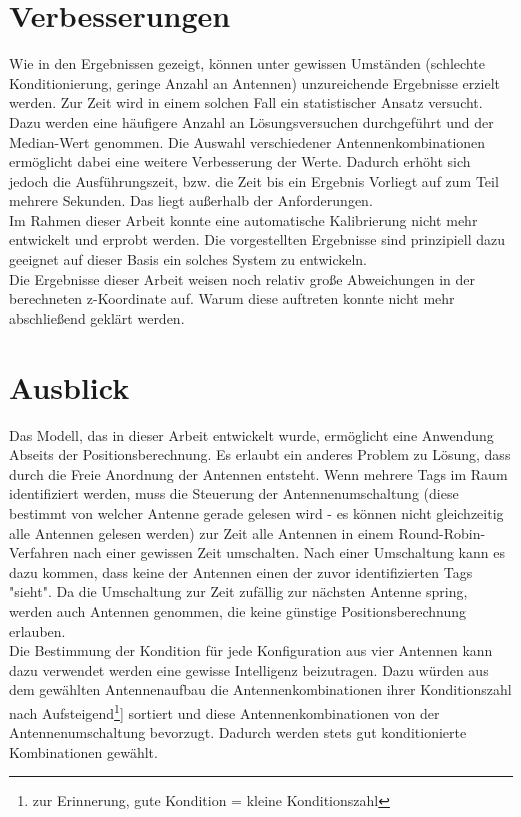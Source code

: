 %
\section{Verbesserungen}
%
Wie in den Ergebnissen gezeigt, können unter gewissen Umständen (schlechte Konditionierung, geringe Anzahl an Antennen) unzureichende Ergebnisse erzielt werden. Zur Zeit wird in einem solchen Fall ein statistischer Ansatz versucht. Dazu werden eine häufigere Anzahl an Lösungsversuchen durchgeführt und der Median-Wert genommen. Die Auswahl verschiedener Antennenkombinationen ermöglicht dabei eine weitere Verbesserung der Werte. Dadurch erhöht sich jedoch die Ausführungszeit, bzw. die Zeit bis ein Ergebnis Vorliegt auf zum Teil mehrere Sekunden. Das liegt außerhalb der Anforderungen. \\
%
Im Rahmen dieser Arbeit konnte eine automatische Kalibrierung nicht mehr entwickelt und erprobt werden. Die vorgestellten Ergebnisse sind prinzipiell dazu geeignet auf dieser Basis ein solches System zu entwickeln.\\

Die Ergebnisse dieser Arbeit weisen noch relativ große Abweichungen in der berechneten z-Koordinate auf. Warum diese auftreten konnte nicht mehr abschließend geklärt werden.
%
\section{Ausblick}
%
Das Modell, das in dieser Arbeit entwickelt wurde, ermöglicht eine Anwendung Abseits der Positionsberechnung. Es erlaubt ein anderes Problem zu Lösung, dass durch die Freie Anordnung der Antennen entsteht. Wenn mehrere Tags im Raum identifiziert werden, muss die Steuerung der Antennenumschaltung (diese bestimmt von welcher Antenne gerade gelesen wird - es können nicht gleichzeitig alle Antennen gelesen werden) zur Zeit alle Antennen in einem Round-Robin-Verfahren nach einer gewissen Zeit umschalten. Nach einer Umschaltung kann es dazu kommen, dass keine der Antennen einen der zuvor identifizierten Tags "sieht". Da die Umschaltung zur Zeit zufällig zur nächsten Antenne spring, werden auch Antennen genommen, die keine günstige Positionsberechnung erlauben.\\
Die Bestimmung der Kondition für jede Konfiguration aus vier Antennen kann dazu verwendet werden eine gewisse Intelligenz beizutragen. Dazu würden aus dem gewählten Antennenaufbau die Antennenkombinationen ihrer Konditionszahl nach Aufsteigend\footnote{zur Erinnerung, gute Kondition = kleine Konditionszahl}] sortiert und diese Antennenkombinationen von der Antennenumschaltung bevorzugt. Dadurch werden stets gut konditionierte Kombinationen gewählt.